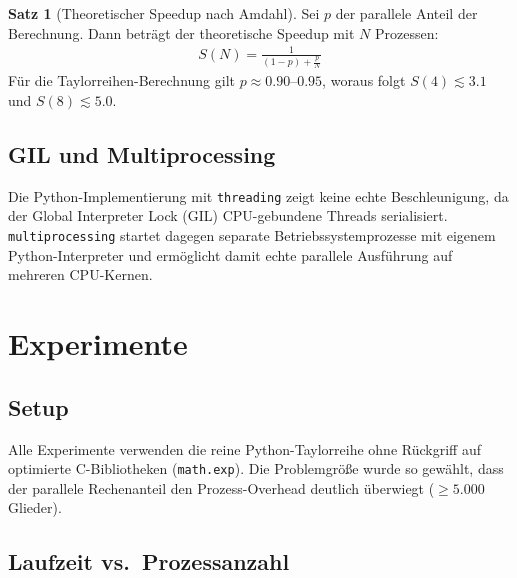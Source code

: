 ﻿\documentclass[a4paper,12pt]{article}
\theoremstyle{definition}
\newtheorem{satz}{Satz}
\begin{document}
\begin{satz}[Theoretischer Speedup nach Amdahl]
Sei $p$ der parallele Anteil der Berechnung. Dann beträgt der theoretische
Speedup mit $N$ Prozessen:
\begin{align}
  S(N) = \frac{1}{(1-p) + \tfrac{p}{N}}
\end{align}
Für die Taylorreihen-Berechnung gilt $p \approx 0.90\text{--}0.95$,
woraus folgt $S(4) \lesssim 3.1$ und $S(8) \lesssim 5.0$.
\end{satz}

\subsection{GIL und Multiprocessing}

Die Python-Implementierung mit \texttt{threading} zeigt keine echte
Beschleunigung, da der Global Interpreter Lock (GIL) CPU-gebundene Threads
serialisiert. \texttt{multiprocessing} startet dagegen separate
Betriebssystemprozesse mit eigenem Python-Interpreter und ermöglicht damit
echte parallele Ausführung auf mehreren CPU-Kernen.

\section{Experimente}

\subsection{Setup}

Alle Experimente verwenden die reine Python-Taylorreihe ohne Rückgriff auf
optimierte C-Bibliotheken (\texttt{math.exp}). Die Problemgröße wurde so
gewählt, dass der parallele Rechenanteil den Prozess-Overhead deutlich
überwiegt ($\geq 5.000$ Glieder).

\subsection{Laufzeit vs.\ Prozessanzahl}
\end{document}
